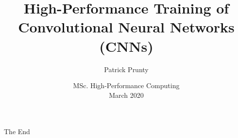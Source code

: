 \documentclass{beamer}
\title{High-Performance Training of Convolutional Neural Networks (CNNs)}
\author{Patrick Prunty}
\date{MSc. High-Performance Computing\\March 2020}
\begin{document}
    \maketitle

    
    
    
    
    


    \begin{frame}
        \huge{\centerline{The End}}
    \end{frame}
\end{document}
